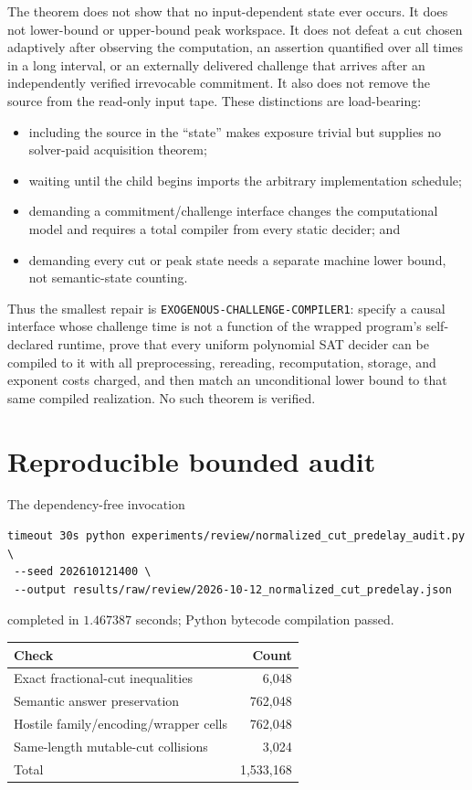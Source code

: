 \documentclass[11pt]{article}
\begin{document}
The theorem does not show that no input-dependent state ever occurs.  It does
not lower-bound or upper-bound peak workspace.  It does not defeat a cut chosen
adaptively after observing the computation, an assertion quantified over all
times in a long interval, or an externally delivered challenge that arrives
after an independently verified irrevocable commitment.  It also does not
remove the source from the read-only input tape.  These distinctions are
load-bearing:
\begin{itemize}[leftmargin=*]
\item including the source in the ``state'' makes exposure trivial but supplies
no solver-paid acquisition theorem;
\item waiting until the child begins imports the arbitrary implementation
schedule;
\item demanding a commitment/challenge interface changes the computational
model and requires a total compiler from every static decider; and
\item demanding every cut or peak state needs a separate machine lower bound,
not semantic-state counting.
\end{itemize}

Thus the smallest repair is \texttt{EXOGENOUS-CHALLENGE-COMPILER1}: specify a
causal interface whose challenge time is not a function of the wrapped
program's self-declared runtime, prove that every uniform polynomial SAT
decider can be compiled to it with all preprocessing, rereading, recomputation,
storage, and exponent costs charged, and then match an unconditional lower
bound to that same compiled realization.  No such theorem is verified.

\section{Reproducible bounded audit}

The dependency-free invocation
\begin{verbatim}
timeout 30s python experiments/review/normalized_cut_predelay_audit.py \
 --seed 202610121400 \
 --output results/raw/review/2026-10-12_normalized_cut_predelay.json
\end{verbatim}
completed in $1.467387$ seconds; Python bytecode compilation passed.

\begin{center}\small
\begin{tabular}{lr}\toprule Check & Count\\ \midrule
Exact fractional-cut inequalities & 6,048\\
Semantic answer preservation & 762,048\\
Hostile family/encoding/wrapper cells & 762,048\\
Same-length mutable-cut collisions & 3,024\\ \midrule
Total & 1,533,168\\ \bottomrule
\end{tabular}
\end{center}
\end{document}
